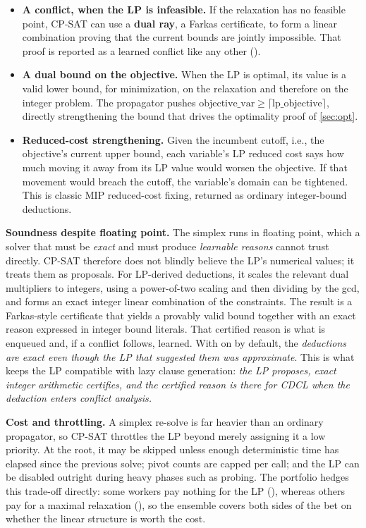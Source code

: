 \begin{itemize}
  \item \textbf{A conflict, when the LP is infeasible.} If the relaxation has no
  feasible point, CP-SAT can use a \textbf{dual ray}, a Farkas certificate, to
  form a linear combination proving that the current bounds are jointly
  impossible. That proof is reported as a learned conflict like any other
  ().
  \item \textbf{A dual bound on the objective.} When the LP is optimal, its value
  is a valid lower bound, for minimization, on the relaxation and therefore on
  the integer problem. The propagator pushes
  $\text{objective\_var} \ge \lceil \text{lp\_objective} \rceil$, directly
  strengthening the bound that drives the optimality proof of
  \cref{sec:opt}.
  \item \textbf{Reduced-cost strengthening.} Given the incumbent cutoff, i.e.,
  the objective's current upper bound, each variable's LP reduced cost says how
  much moving it away from its LP value would worsen the objective. If that
  movement would breach the cutoff, the variable's domain can be tightened. This
  is classic MIP reduced-cost fixing, returned as ordinary integer-bound
  deductions.
\end{itemize}

\textbf{Soundness despite floating point.} The simplex runs in floating point,
which a solver that must be \emph{exact} and must produce \emph{learnable
reasons} cannot trust directly. CP-SAT therefore does not blindly believe the
LP's numerical values; it treats them as proposals. For LP-derived deductions, it
scales the relevant dual multipliers to integers, using a power-of-two scaling
and then dividing by the gcd, and forms an exact integer linear combination of
the constraints. The result is a Farkas-style certificate that yields a provably
valid bound together with an exact reason expressed in integer bound literals.
That certified reason is what is enqueued and, if a conflict follows, learned.
With  on by default, the \emph{deductions are exact
even though the LP that suggested them was approximate}. This is what keeps the
LP compatible with lazy clause generation: \emph{the LP proposes, exact integer
arithmetic certifies, and the certified reason is there for CDCL when the
deduction enters conflict analysis.}

\textbf{Cost and throttling.} A simplex re-solve is far heavier than an ordinary
propagator, so CP-SAT throttles the LP beyond merely assigning it a low priority.
At the root, it may be skipped unless enough deterministic time has elapsed since
the previous solve; pivot counts are capped per call; and the LP can be disabled
outright during heavy phases such as probing. The portfolio hedges this
trade-off directly: some workers pay nothing for the LP (), whereas
others pay for a maximal relaxation (), so the ensemble covers both
sides of the bet on whether the linear structure is worth the cost.

